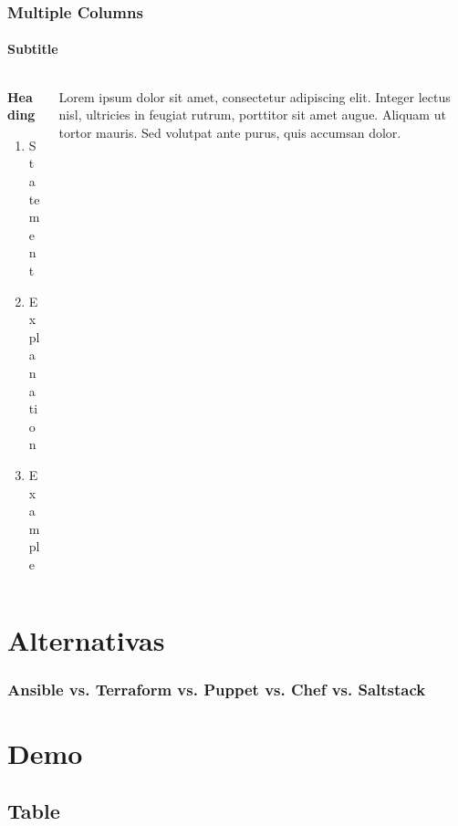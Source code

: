 \documentclass[
	11pt, %
]{beamer}
\begin{document}

\begin{frame}
	\frametitle{Multiple Columns}
	\framesubtitle{Subtitle} %
	
	\begin{columns}[c] %
		\begin{column}{0.45\textwidth} %
			\textbf{Heading}
			\begin{enumerate}
				\item Statement
				\item Explanation
				\item Example
			\end{enumerate}
		\end{column}
		\begin{column}{0.5\textwidth} %
			Lorem ipsum dolor sit amet, consectetur adipiscing elit. Integer lectus nisl, ultricies in feugiat rutrum, porttitor sit amet augue. Aliquam ut tortor mauris. Sed volutpat ante purus, quis accumsan dolor.
		\end{column}
	\end{columns}
\end{frame}

\section{Alternativas}

\begin{frame}
	\frametitle{Ansible vs. Terraform vs. Puppet vs. Chef vs. Saltstack}
	
	

\end{frame}


\section{Demo}

\subsection{Table}
\end{document}
